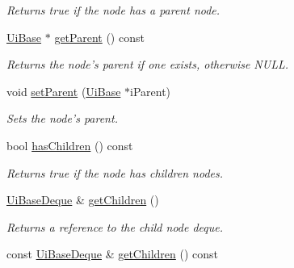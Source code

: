 \begin{DoxyCompactItemize}
\begin{DoxyCompactList}\small\item\em Returns true if the node has a parent node. \end{DoxyCompactList}\item 
\hypertarget{class_ui_base_a2fc696f237cf6d672b47f83783301b48}{\hyperlink{class_ui_base}{Ui\-Base} $\ast$ \hyperlink{class_ui_base_a2fc696f237cf6d672b47f83783301b48}{get\-Parent} () const }\label{class_ui_base_a2fc696f237cf6d672b47f83783301b48}

\begin{DoxyCompactList}\small\item\em Returns the node's parent if one exists, otherwise N\-U\-L\-L. \end{DoxyCompactList}\item 
\hypertarget{class_ui_base_a8382855e57634659c515d9919e797059}{void \hyperlink{class_ui_base_a8382855e57634659c515d9919e797059}{set\-Parent} (\hyperlink{class_ui_base}{Ui\-Base} $\ast$i\-Parent)}\label{class_ui_base_a8382855e57634659c515d9919e797059}

\begin{DoxyCompactList}\small\item\em Sets the node's parent. \end{DoxyCompactList}\item 
\hypertarget{class_ui_base_ab337ea219716fea8836a1ff99b3ea07f}{bool \hyperlink{class_ui_base_ab337ea219716fea8836a1ff99b3ea07f}{has\-Children} () const }\label{class_ui_base_ab337ea219716fea8836a1ff99b3ea07f}

\begin{DoxyCompactList}\small\item\em Returns true if the node has children nodes. \end{DoxyCompactList}\item 
\hypertarget{class_ui_base_a1dad56e383dacec4cc29be087ceb4af4}{\hyperlink{class_ui_base_a9a56b225c8af039ff8a5e678cf4668d2}{Ui\-Base\-Deque} \& \hyperlink{class_ui_base_a1dad56e383dacec4cc29be087ceb4af4}{get\-Children} ()}\label{class_ui_base_a1dad56e383dacec4cc29be087ceb4af4}

\begin{DoxyCompactList}\small\item\em Returns a reference to the child node deque. \end{DoxyCompactList}\item 
\hypertarget{class_ui_base_afa7c1ea5f4ee94c3d6d64f6e6a3e0d92}{const \hyperlink{class_ui_base_a9a56b225c8af039ff8a5e678cf4668d2}{Ui\-Base\-Deque} \& \hyperlink{class_ui_base_afa7c1ea5f4ee94c3d6d64f6e6a3e0d92}{get\-Children} () const }\label{class_ui_base_afa7c1ea5f4ee94c3d6d64f6e6a3e0d92}


\end{DoxyCompactItemize}
